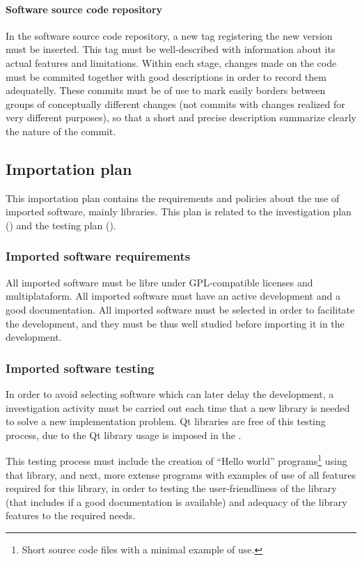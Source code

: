 \documentclass[twocolumn]{article}
\begin{document}
\paragraph{Software source code repository}
In the software source code repository, a new tag registering the new
version must be inserted. This tag must be well-described with
information about its actual features and limitations. Within each
stage, changes made on the code must be commited together with good
descriptions in order to record them adequatelly. These commits must
be of use to mark easily borders between groups of conceptually
different changes (not commits with changes realized for
very different purposes), so that a short and precise description
summarize clearly the nature of the commit.

\subsection{Importation plan}
\label{ssec:importation-plan}
This importation plan contains the requirements and policies about the
use of imported software, mainly libraries. This plan is related to
the investigation plan () and the
testing plan ().

\subsubsection{Imported software requirements}
All imported software must be libre under GPL-compatible
licenses and multiplataform. All imported software must have an active
development and a good documentation. All imported software must be
selected in order to facilitate the development, and they must be thus
well studied before importing it in the \fav development.

\subsubsection{Imported software testing}
In order to avoid selecting software which can later delay the
development, a investigation activity must be carried out each time
that a new library is needed to solve a new implementation problem. Qt
libraries are free of this testing process, due to the Qt library
usage is imposed in the \favc.

This testing process must include the creation of ``Hello
world'' programs\footnote{Short source code files with a minimal
  example of use.} using that library, and next, more extense programs
with examples of use of all features required for this library, in
order to testing the user-friendliness of the library (that includes if a
good documentation is available) and adequacy of the library features
to the required needs.
\end{document}
